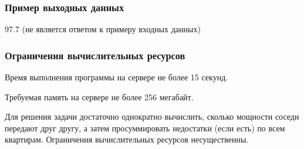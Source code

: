 \subsubsection*{Пример выходных данных}

97.7
(не является ответом к примеру входных данных)

\subsubsection*{Ограничения вычислительных ресурсов}

Время выполнения программы на сервере не более 15 секунд.

Требуемая память на сервере не более 256 мегабайт.

\solutionSection

Для решения задачи достаточно однократно вычислить, сколько мощности соседи передают друг другу, а затем просуммировать недостатки (если есть) по всем квартирам. Ограничения вычислительных ресурсов несущественны.



